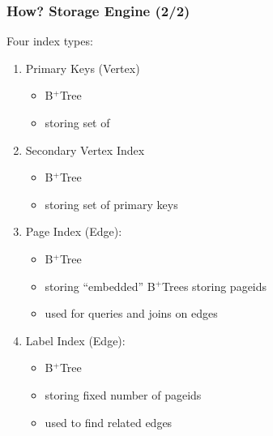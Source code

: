 \documentclass[mathserif,usenames,dvipsnames]{beamer}
\begin{document}
\begin{frame}
\frametitle{How? Storage Engine (2/2)}
Four index types:
\begin{enumerate}
\item Primary Keys (Vertex)
      \begin{itemize}
      \item B$^+$Tree
      \item storing set of 
      \end{itemize}
\item Secondary Vertex Index
      \begin{itemize}
      \item B$^+$Tree
      \item storing set of primary keys
      \end{itemize}
\item Page Index (Edge):
      \begin{itemize}
      \item B$^+$Tree
      \item storing ``embedded'' B$^+$Trees
            storing pageids
      \item used for queries and joins on edges
      \end{itemize}
\item Label Index (Edge):
      \begin{itemize}
      \item B$^+$Tree
      \item storing fixed number of pageids
      \item used to find related edges
      \end{itemize}
\end{enumerate}
\end{frame}
\end{document}
